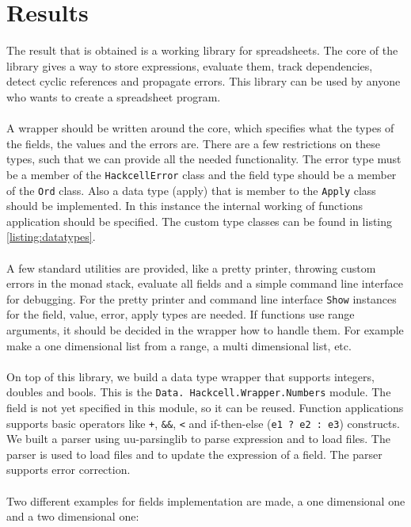 \documentclass{article}
\begin{document}
	\section{Results}
	The result that is obtained is a working library for spreadsheets. The core of the library gives a way to store expressions, evaluate them, track dependencies, detect cyclic references and propagate errors. This library can be used by anyone who wants to create a spreadsheet program.
\\\\
	A wrapper should be written around the core, which specifies what the types of the fields, the values and the errors are. There are a few restrictions on these types, such that we can provide all the needed functionality. The error type must be a member of the \texttt{HackcellError} class and the field type should be a member of the \texttt{Ord} class. Also a data type (apply) that is member to the \texttt{Apply} class should be implemented. In this instance the internal working of functions application should be specified. The custom type classes can be found in listing \ref{listing:datatypes}.
\\\\	
	A few standard utilities are provided, like a pretty printer, throwing custom errors in the monad stack, evaluate all fields and a simple command line interface for debugging. For the pretty printer and command line interface \texttt{Show} instances for the field, value, error, apply types are needed. If functions use range arguments, it should be decided in the wrapper how to handle them. For example make a one dimensional list from a range, a multi dimensional list, etc.
\\\\	
	On top of this library, we build a data type wrapper that supports integers, doubles and bools. This is the \texttt{Data. Hackcell.Wrapper.Numbers} module. The field is not yet specified in this module, so it can be reused. Function applications supports basic operators like \texttt{+}, \texttt{\&\&}, \texttt{<} and if-then-else (\texttt{e1 ? e2 : e3}) constructs. We built a parser using uu-parsinglib to parse expression and to load files. The parser is used to load files and to update the expression of a field. The parser supports error correction.
\\\\	
	Two different examples for fields implementation are made, a one dimensional one and a two dimensional one:
\end{document}
